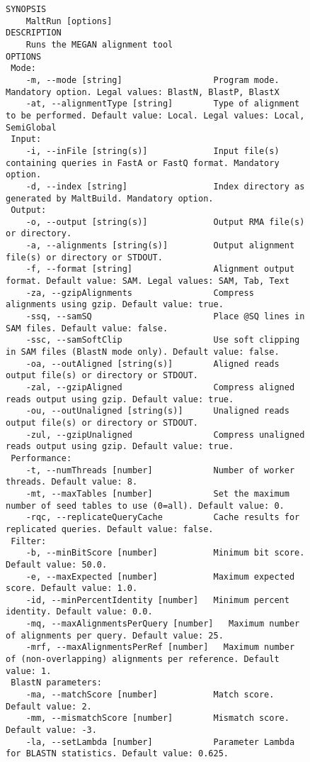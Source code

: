 \documentclass[11pt]{article}
\begin{document}
 \begin{figure}[h]
{\tiny
\begin{verbatim}
SYNOPSIS
	MaltRun [options]
DESCRIPTION
	Runs the MEGAN alignment tool
OPTIONS
 Mode:
	-m, --mode [string]                  Program mode. Mandatory option. Legal values: BlastN, BlastP, BlastX
	-at, --alignmentType [string]        Type of alignment to be performed. Default value: Local. Legal values: Local, SemiGlobal
 Input:
	-i, --inFile [string(s)]             Input file(s) containing queries in FastA or FastQ format. Mandatory option.
	-d, --index [string]                 Index directory as generated by MaltBuild. Mandatory option.
 Output:
	-o, --output [string(s)]             Output RMA file(s) or directory. 
	-a, --alignments [string(s)]         Output alignment file(s) or directory or STDOUT. 
	-f, --format [string]                Alignment output format. Default value: SAM. Legal values: SAM, Tab, Text
	-za, --gzipAlignments                Compress alignments using gzip. Default value: true.
	-ssq, --samSQ                        Place @SQ lines in SAM files. Default value: false.
	-ssc, --samSoftClip                  Use soft clipping in SAM files (BlastN mode only). Default value: false.
	-oa, --outAligned [string(s)]        Aligned reads output file(s) or directory or STDOUT. 
	-zal, --gzipAligned                  Compress aligned reads output using gzip. Default value: true.
	-ou, --outUnaligned [string(s)]      Unaligned reads output file(s) or directory or STDOUT. 
	-zul, --gzipUnaligned                Compress unaligned reads output using gzip. Default value: true.
 Performance:
	-t, --numThreads [number]            Number of worker threads. Default value: 8.
	-mt, --maxTables [number]            Set the maximum number of seed tables to use (0=all). Default value: 0.
	-rqc, --replicateQueryCache          Cache results for replicated queries. Default value: false.
 Filter:
	-b, --minBitScore [number]           Minimum bit score. Default value: 50.0.
	-e, --maxExpected [number]           Maximum expected score. Default value: 1.0.
	-id, --minPercentIdentity [number]   Minimum percent identity. Default value: 0.0.
	-mq, --maxAlignmentsPerQuery [number]   Maximum number of alignments per query. Default value: 25.
	-mrf, --maxAlignmentsPerRef [number]   Maximum number of (non-overlapping) alignments per reference. Default value: 1.
 BlastN parameters:
	-ma, --matchScore [number]           Match score. Default value: 2.
	-mm, --mismatchScore [number]        Mismatch score. Default value: -3.
	-la, --setLambda [number]            Parameter Lambda for BLASTN statistics. Default value: 0.625.

\end{verbatim}}
\end{figure}
\end{document}
